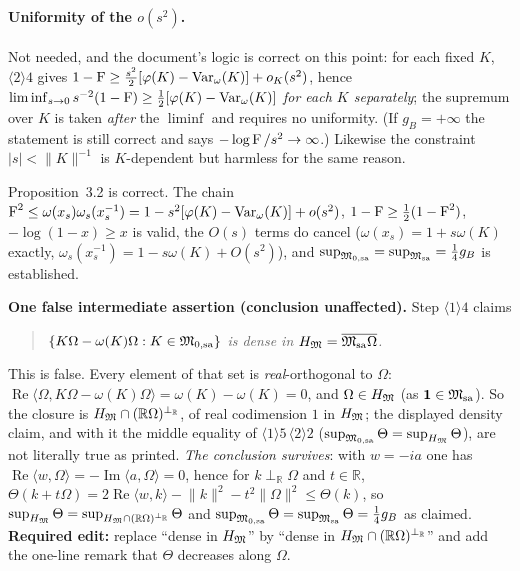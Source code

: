 \documentclass[11pt]{article}
\newcommand{\ip}[2]{\langle#1,#2\rangle}
\newcommand{\norm}[1]{\lVert#1\rVert}
\newcommand{\Msa}{\cM_{\mathrm{sa}}}
\newcommand{\HM}{H_{\cM}}
\newcommand{\gB}{g_B}
\newcommand{\Var}{\operatorname{Var}}
\newcommand{\one}{\mathbf 1}
\newcommand{\Om}{\Omega}
\begin{document}
\paragraph{Uniformity of the $o(s^2)$.}
Not needed, and the document's logic is correct on this point: for each fixed $K$, $\langle2\rangle4$ gives
$1-\Fid\ge\frac{s^2}2[\varphi(K)-\Var_\omega(K)]+o_K(s^2)$, hence
$\liminf_{s\to0}s^{-2}(1-\Fid)\ge\frac12[\varphi(K)-\Var_\omega(K)]$ \emph{for each $K$ separately};
the supremum over $K$ is taken \emph{after} the $\liminf$ and requires no uniformity.  (If $\gB=+\infty$ the
statement is still correct and says $-\log\operatorname{F}/s^2\to\infty$.)  Likewise the constraint
$|s|<\norm K^{-1}$ is $K$-dependent but harmless for the same reason.

\begin{verdictok}
Proposition~3.2 is correct.  The chain
$\Fid^2\le\omega(x_s)\omega_s(x_s^{-1})=1-s^2[\varphi(K)-\Var_\omega(K)]+o(s^2)$,
$1-\operatorname{F}\ge\frac12(1-\operatorname{F}^2)$, $-\log(1-x)\ge x$ is valid, the $O(s)$ terms do cancel
($\omega(x_s)=1+s\omega(K)$ exactly, $\omega_s(x_s^{-1})=1-s\omega(K)+O(s^2)$), and
$\sup_{\cM_{0,\mathrm{sa}}}=\sup_{\Msa}=\frac14\gB$ is established.
\end{verdictok}

\begin{verdictgap}
\textbf{One false intermediate assertion (conclusion unaffected).}  Step $\langle1\rangle4$ claims
\begin{quote}\itshape
$\{K\Om-\omega(K)\Om:K\in\cM_{0,\mathrm{sa}}\}$ is dense in $\HM=\overline{\Msa\Om}$.
\end{quote}
This is false.  Every element of that set is \emph{real}-orthogonal to $\Om$:
$\operatorname{Re}\ip\Om{K\Om-\omega(K)\Om}=\omega(K)-\omega(K)=0$, and $\Om\in\HM$ (as $\one\in\Msa$).
So the closure is $\HM\cap(\mathbb R\Om)^{\perp_{\mathbb R}}$, of real codimension $1$ in $\HM$; the
displayed density claim, and with it the middle equality of $\langle1\rangle5\,\langle2\rangle2$
($\sup_{\cM_{0,\mathrm{sa}}}\Theta=\sup_{\HM}\Theta$), are not literally true as printed.
\emph{The conclusion survives}: with $w=-ia$ one has $\operatorname{Re}\ip w\Om=-\operatorname{Im}\ip a\Om=0$,
hence for $k\perp_{\mathbb R}\Om$ and $t\in\mathbb R$,
$\Theta(k+t\Om)=2\operatorname{Re}\ip wk-\norm k^2-t^2\norm\Om^2\le\Theta(k)$, so
$\sup_{\HM}\Theta=\sup_{\HM\cap(\mathbb R\Om)^{\perp_{\mathbb R}}}\Theta$ and
$\sup_{\cM_{0,\mathrm{sa}}}\Theta=\sup_{\Msa}\Theta=\frac14\gB$ as claimed.
\textbf{Required edit:} replace ``dense in $\HM$'' by ``dense in
$\HM\cap(\mathbb R\Om)^{\perp_{\mathbb R}}$'' and add the one-line remark that $\Theta$ decreases along
$\Om$.
\end{verdictgap}
\end{document}
